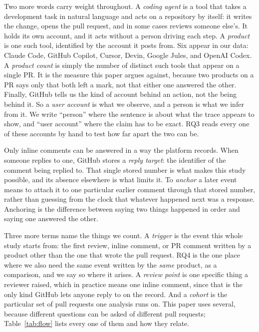 \documentclass[lineno,pdflatex,sn-basic]{sn-jnl}
\begin{document}
Two more words carry weight throughout. A \emph{coding agent} is a tool that
takes a development task in natural language and acts on a repository by itself:
it writes the change, opens the pull request, and in some cases reviews someone
else's. It holds its own account, and it acts without a person driving each step.
A \emph{product} is one such tool, identified by the account it posts from. Six
appear in our data: Claude Code, GitHub Copilot, Cursor, Devin, Google Jules, and
OpenAI Codex. A \emph{product count} is simply the number of distinct such tools
that appear on a single PR. It is the measure this paper argues against, because
two products on a PR says only that both left a mark, not that either one
answered the other. Finally, GitHub tells us the kind of account behind an
action, not the being behind it. So a \emph{user account} is what we observe,
and a person is what we infer from it. We write ``person'' where the sentence is
about what the trace appears to show, and ``user account'' where the claim has to
be exact. RQ3 reads every one of these accounts by hand to test how far apart the
two can be.

Only inline comments can be answered in a way the platform records. When someone
replies to one, GitHub stores a \emph{reply target}: the identifier of the
comment being replied to. That single stored number is what makes this study
possible, and its absence elsewhere is what limits it. To \emph{anchor} a later
event means to attach it to one particular earlier comment through that stored
number, rather than guessing from the clock that whatever happened next was a
response. Anchoring is the difference between saying two things happened in order
and saying one answered the other.

Three more terms name the things we count. A \emph{trigger} is the event this
whole study starts from: the first review, inline comment, or PR comment written
by a product other than the one that wrote the pull request. RQ4 is the one place
where we also need the same event written by the \emph{same} product, as a
comparison, and we say so where it arises. A \emph{review
point} is one specific thing a reviewer raised, which in practice means one
inline comment, since that is the only kind GitHub lets anyone reply to on the
record. And a \emph{cohort} is the particular set of pull requests one analysis
runs on. This paper uses several, because different questions can be asked of
different pull requests; Table~\ref{tab:flow} lists every one of them and
how they relate.
\end{document}
